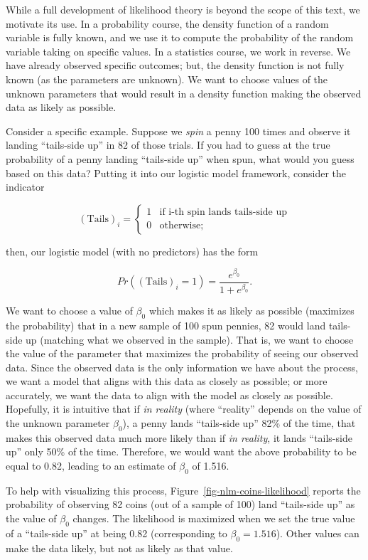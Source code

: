 \documentclass[
  letterpaper,
  DIV=11,
  numbers=noendperiod]{scrreprt}
\theoremstyle{definition}
\theoremstyle{definition}
\theoremstyle{remark}
\begin{document}
While a full development of likelihood theory is beyond the scope of
this text, we motivate its use. In a probability course, the density
function of a random variable is fully known, and we use it to compute
the probability of the random variable taking on specific values. In a
statistics course, we work in reverse. We have already observed specific
outcomes; but, the density function is not fully known (as the
parameters are unknown). We want to choose values of the unknown
parameters that would result in a density function making the observed
data as likely as possible.

Consider a specific example. Suppose we \emph{spin} a penny 100 times
and observe it landing ``tails-side up'' in 82 of those trials. If you
had to guess at the true probability of a penny landing ``tails-side
up'' when spun, what would you guess based on this data? Putting it into
our logistic model framework, consider the indicator

\[
(\text{Tails})_i = \begin{cases} 1 & \text{if i-th spin lands tails-side up} \\ 0 & \text{otherwise;} \end{cases}
\]

then, our logistic model (with no predictors) has the form

\[Pr\left((\text{Tails})_i = 1\right) = \frac{e^{\beta_0}}{1 + e^{\beta_0}}.\]

We want to choose a value of \(\beta_0\) which makes it as likely as
possible (maximizes the probability) that in a new sample of 100 spun
pennies, 82 would land tails-side up (matching what we observed in the
sample). That is, we want to choose the value of the parameter that
maximizes the probability of seeing our observed data. Since the
observed data is the only information we have about the process, we want
a model that aligns with this data as closely as possible; or more
accurately, we want the data to align with the model as closely as
possible. Hopefully, it is intuitive that if \emph{in reality} (where
``reality'' depends on the value of the unknown parameter \(\beta_0\)),
a penny lands ``tails-side up'' 82\% of the time, that makes this
observed data much more likely than if \emph{in reality}, it lands
``tails-side up'' only 50\% of the time. Therefore, we would want the
above probability to be equal to 0.82, leading to an estimate of
\(\beta_0\) of 1.516.

To help with visualizing this process,
Figure~\ref{fig-nlm-coins-likelihood} reports the probability of
observing 82 coins (out of a sample of 100) land ``tails-side up'' as
the value of \(\beta_0\) changes. The likelihood is maximized when we
set the true value of a ``tails-side up'' at being 0.82 (corresponding
to \(\beta_0 = 1.516\)). Other values can make the data likely, but not
as likely as that value.
\end{document}
